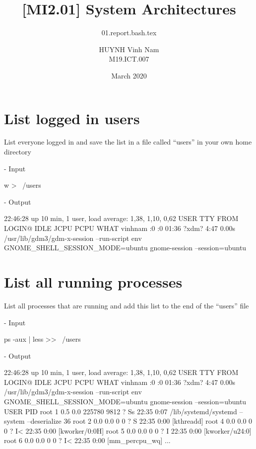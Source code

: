 \documentclass[10pt, a4paper]{article}
\title{[MI2.01] System Architectures}
\subtitle{01.report.bash.tex}
\author{HUYNH Vinh Nam \\ M19.ICT.007}
\date{March 2020}
\begin{document}
\maketitle

\section{List logged in users}

List everyone logged in and save the list in a file called “users” in your own home directory

\noindent - Input

\begin{verbbox}
w > ~/users
\end{verbbox}

\fbox{
\theverbbox
}

\noindent - Output

\begin{verbbox}
 22:46:28 up 10 min,  1 user,  load average: 1,38, 1,10, 0,62
USER     TTY      FROM             LOGIN@   IDLE   JCPU   PCPU WHAT
vinhnam  :0       :0               01:36   ?xdm?   4:47   0.00s /usr/lib/gdm3/gdm-x-session 
--run-script env GNOME_SHELL_SESSION_MODE=ubuntu gnome-session --session=ubuntu
\end{verbbox}

\fbox{
\theverbbox
}

\section{List all running processes}

List all processes that are running and add this list to the end of the “users” file

\noindent - Input

\begin{verbbox}
ps -aux | less >> ~/users
\end{verbbox}

\fbox{
\theverbbox
}

\pagebreak

\noindent - Output

\begin{verbbox}
 22:46:28 up 10 min,  1 user,  load average: 1,38, 1,10, 0,62
USER     TTY      FROM             LOGIN@   IDLE   JCPU   PCPU WHAT
vinhnam  :0       :0               01:36   ?xdm?   4:47   0.00s /usr/lib/gdm3/gdm-x-session 
--run-script env GNOME_SHELL_SESSION_MODE=ubuntu gnome-session --session=ubuntu
USER       PID %
root         1  0.5  0.0 225780  9812 ?        Ss   22:35   0:07 /lib/systemd/systemd 
--system --deserialize 36
root         2  0.0  0.0      0     0 ?        S    22:35   0:00 [kthreadd]
root         4  0.0  0.0      0     0 ?        I<   22:35   0:00 [kworker/0:0H]
root         5  0.0  0.0      0     0 ?        I    22:35   0:00 [kworker/u24:0]
root         6  0.0  0.0      0     0 ?        I<   22:35   0:00 [mm_percpu_wq]
...
\end{verbbox}
\end{document}
